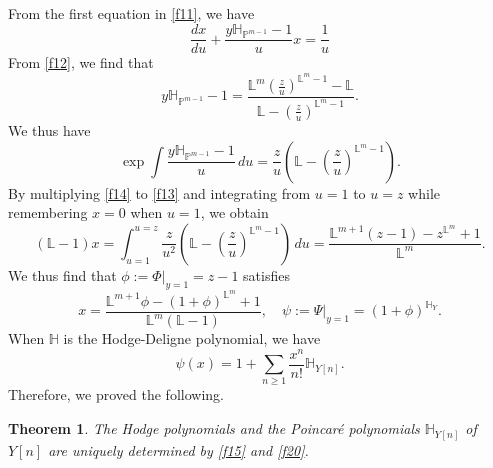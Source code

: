 \documentclass[11pt]{amsart}
\newtheorem{theorem}{Theorem}[section]
\newcommand{\PP}{\mathbb{P}}
\def\LL{\mathbb{L}}
\def\beq{\begin{equation}}
\def\eeq{\end{equation}}
\def\HH{\mathbb{H}}
\begin{document}
From the first equation in \eqref{f11}, we have
\beq\label{f13}
\frac{dx}{du} + \frac{y\HH_{\PP^{m-1}} -1 }{u} x =\frac{1}{u}\eeq 
From \eqref{f12}, we find that 
$$y\HH_{\PP^{m-1}} -1  = \frac{\LL^m\left( \frac{z}{u} \right)^{\LL^m-1}-\LL}{\LL-\left( \frac{z}{u}\right) ^{\LL^m-1}}.$$
We thus have 
\beq\label{f14} \exp \int \frac{y\HH_{\PP^{m-1}} -1}{u}  \,du = \frac{z}{u}\left( \LL - \left(\frac{z}{u}\right)^{\LL^m-1}\right).\eeq
By multiplying \eqref{f14} to \eqref{f13} and integrating from $u=1$ to $u=z$ while remembering $x=0$ when $u=1$, we obtain
$$(\LL-1)x=\int_{u=1}^{u=z} \frac{z}{u^2}\left( \LL - \left(\frac{z}{u}\right)^{\LL^m-1}\right) \,du =\frac{\LL^{m+1}(z-1)-z^{\LL^m}+1}{\LL^m}.$$
We thus find that $\phi:=\Phi|_{y=1}=z-1$ satisfies  
\beq\label{f15}
x=\frac{\LL^{m+1}\phi-(1+\phi)^{\LL^m}+1}{\LL^m(\LL-1)}, \quad \psi:=\Psi|_{y=1}=(1+\phi)^{\HH_Y}.
\eeq 
When $\HH$ is the Hodge-Deligne polynomial, we have 
\beq\label{f20} \psi(x)=1+\sum_{n\ge 1}\frac{x^n}{n!}\HH_{Y[n]}.\eeq 
Therefore, we proved the following.
\begin{theorem} \cite[(4.22) and (4.24)]{Manin1999}
    The Hodge polynomials and the Poincar\'e polynomials $\HH_{Y[n]}$ of $Y[n]$ are uniquely determined by \eqref{f15} and \eqref{f20}.
\end{theorem}


\bigskip









\end{document}
